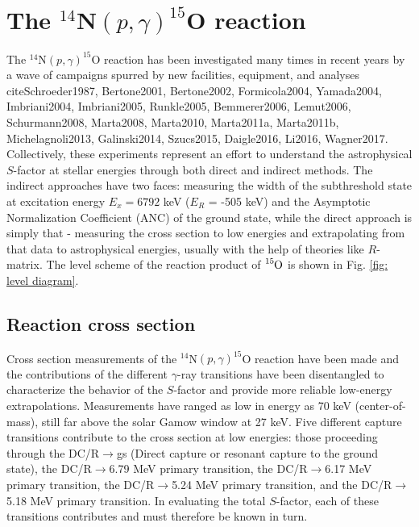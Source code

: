 \section{The $^{14}$N$\left( p,\gamma \right) ^{15}$O reaction}
\label{sec: 14N(p,g)}

The $^{14}$N$\left( p,\gamma \right) ^{15}$O reaction has been investigated many times in recent years by a wave of campaigns spurred by new facilities, equipment, and analyses cite{Schroeder1987, Bertone2001, Bertone2002, Formicola2004, Yamada2004, Imbriani2004, Imbriani2005, Runkle2005, Bemmerer2006, Lemut2006, Schurmann2008, Marta2008, Marta2010, Marta2011a, Marta2011b, Michelagnoli2013, Galinski2014, Szucs2015, Daigle2016, Li2016, Wagner2017}. Collectively, these experiments represent an effort to understand the astrophysical $S$-factor at stellar energies through both direct and indirect methods. The indirect approaches have two faces: measuring the width of the subthreshold state at excitation energy $E_{x} =6792$ keV ($E_{R}$ = -505 keV) and the Asymptotic Normalization Coefficient (ANC) of the ground state, while the direct approach is simply that - measuring the cross section to low energies and extrapolating from that data to astrophysical energies, usually with the help of theories like $R$-matrix. The level scheme of the reaction product of $\ce{^{15}O}$ is shown in Fig. \ref{fig: level diagram}.

\subsection{Reaction cross section}

Cross section measurements of the $^{14}$N$\left( p,\gamma \right) ^{15}$O reaction have been made and the contributions of the different $\gamma$-ray transitions have been disentangled to characterize the behavior of the $S$-factor  and provide more reliable low-energy extrapolations. Measurements have ranged as low in energy as 70 keV (center-of-mass), still far above the solar Gamow window at 27 keV. Five different capture transitions contribute to the cross section at low energies: those proceeding through the DC/R$\rightarrow$gs (Direct capture or resonant capture to the ground state), the DC/R$\rightarrow$6.79 MeV primary transition, the DC/R$\rightarrow$6.17 MeV primary transition, the DC/R$\rightarrow$5.24 MeV primary transition, and the DC/R$\rightarrow$5.18 MeV primary transition. In evaluating the total $S$-factor, each of these transitions contributes and must therefore be known in turn. 


